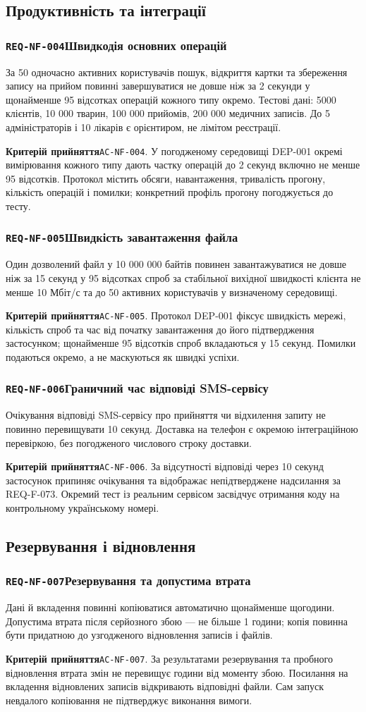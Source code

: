 \documentclass[11pt,a4paper]{article}
\newcommand{\requirement}[4]{%
  \Needspace{7\baselineskip}%
  \subsubsection*{\hypertarget{#1}{\texttt{#1}}\quad #2}%
  #3\par
  \textbf{Критерій прийняття}\quad #4\par\medskip}
\begin{document}
\subsection{Продуктивність та інтеграції}
\requirement{REQ-NF-004}{Швидкодія основних операцій}{За 50 одночасно активних користувачів пошук, відкриття картки та збереження запису на прийом повинні завершуватися не довше ніж за 2 секунди у щонайменше 95 відсотках операцій кожного типу окремо. Тестові дані: 5000 клієнтів, 10 000 тварин, 100 000 прийомів, 200 000 медичних записів. До 5 адміністраторів і 10 лікарів є орієнтиром, не лімітом реєстрації.}{\hypertarget{AC-NF-004}{\texttt{AC-NF-004}}. У погодженому середовищі DEP-001 окремі вимірювання кожного типу дають частку операцій до 2 секунд включно не менше 95 відсотків. Протокол містить обсяги, навантаження, тривалість прогону, кількість операцій і помилки; конкретний профіль прогону погоджується до тесту.}

\requirement{REQ-NF-005}{Швидкість завантаження файла}{Один дозволений файл у 10 000 000 байтів повинен завантажуватися не довше ніж за 15 секунд у 95 відсотках спроб за стабільної вихідної швидкості клієнта не менше 10 Мбіт/с та до 50 активних користувачів у визначеному середовищі.}{\hypertarget{AC-NF-005}{\texttt{AC-NF-005}}. Протокол DEP-001 фіксує швидкість мережі, кількість спроб та час від початку завантаження до його підтвердження застосунком; щонайменше 95 відсотків спроб вкладаються у 15 секунд. Помилки подаються окремо, а не маскуються як швидкі успіхи.}

\requirement{REQ-NF-006}{Граничний час відповіді SMS-сервісу}{Очікування відповіді SMS-сервісу про прийняття чи відхилення запиту не повинно перевищувати 10 секунд. Доставка на телефон є окремою інтеграційною перевіркою, без погодженого числового строку доставки.}{\hypertarget{AC-NF-006}{\texttt{AC-NF-006}}. За відсутності відповіді через 10 секунд застосунок припиняє очікування та відображає непідтверджене надсилання за REQ-F-073. Окремий тест із реальним сервісом засвідчує отримання коду на контрольному українському номері.}

\subsection{Резервування і відновлення}
\requirement{REQ-NF-007}{Резервування та допустима втрата}{Дані й вкладення повинні копіюватися автоматично щонайменше щогодини. Допустима втрата після серйозного збою — не більше 1 години; копія повинна бути придатною до узгодженого відновлення записів і файлів.}{\hypertarget{AC-NF-007}{\texttt{AC-NF-007}}. За результатами резервування та пробного відновлення втрата змін не перевищує години від моменту збою. Посилання на вкладення відновлених записів відкривають відповідні файли. Сам запуск невдалого копіювання не підтверджує виконання вимоги.}
\end{document}
